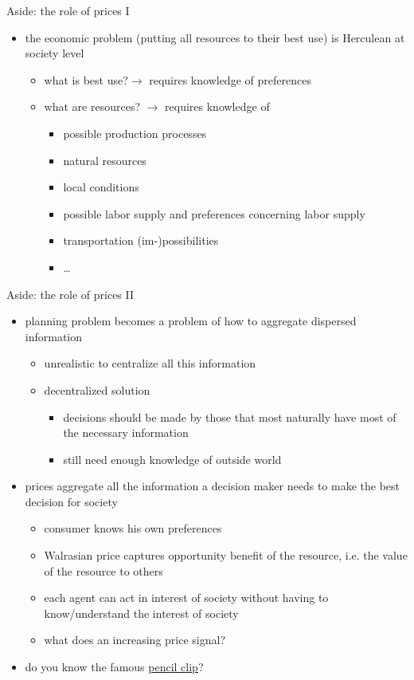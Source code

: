 \documentclass[bigger]{beamer}
\begin{document}
\begin{frame}[label={sec:orgc083651}]{Aside: the role of prices I}
\begin{itemize}
\item the economic problem (putting all resources to their best use) is Herculean at society level
\begin{itemize}
\item what is best use?\linebreak \(\rightarrow\) requires knowledge of preferences
\item what are resources? \linebreak \(\rightarrow\) requires knowledge of
\begin{itemize}
\item possible production processes
\item natural resources
\item local conditions
\item possible labor supply and preferences concerning labor supply
\item transportation (im-)possibilities
\item \ldots{}
\end{itemize}
\end{itemize}
\end{itemize}
\end{frame}
\begin{frame}[label={sec:org13b93be}]{Aside: the role of prices II}
\begin{itemize}
\item planning problem becomes a problem of how to aggregate dispersed information
\begin{itemize}
\item unrealistic to centralize all this information
\item decentralized solution
\begin{itemize}
\item decisions should be made by those that most naturally have most of the necessary information
\item still need enough knowledge of outside world
\end{itemize}
\end{itemize}
\item prices aggregate all the information a decision maker needs to make the best decision for society
\begin{itemize}
\item consumer knows his own preferences
\item Walrasian price captures opportunity benefit of the resource, i.e. the value of the resource to others
\item each agent can act in interest of society without having to know/understand the interest of society
\item what does an increasing price signal?
\end{itemize}
\item do you know the famous  \alert{\href{https://youtu.be/jPbh4NyKH0M}{pencil clip}}?
\end{itemize}
\end{frame}
\end{document}
